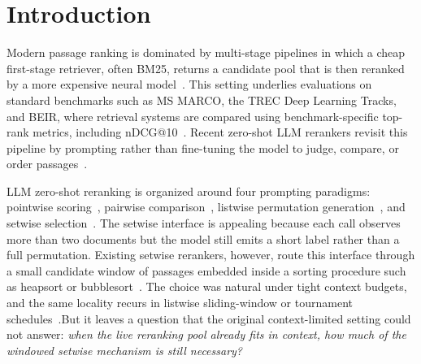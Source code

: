 \section{Introduction}
\label{sec:introduction}


Modern passage ranking is dominated by multi-stage pipelines in which a cheap first-stage retriever, often BM25, returns a candidate pool that is then reranked by a more expensive neural model~\citep{robertson2009probabilistic,nogueira2019passage,nogueira2020monot5,yates2021pretrained}. This setting underlies evaluations on standard benchmarks such as MS MARCO, the TREC Deep Learning Tracks, and BEIR, where retrieval systems are compared using benchmark-specific top-rank metrics, including nDCG@10~\citep{bajaj2016msmarco,craswell2020trecDL,craswell2021trecDL,thakur2021beir,jarvelin2002cumulated}. Recent zero-shot LLM rerankers revisit this pipeline by prompting rather than fine-tuning the model to judge, compare, or order passages~\citep{sachan2022upr,sun2023rankgpt,ma2023zeroshotlistwise,qin2024prp,zhuang2024setwise,pradeep2023rankvicuna,pradeep2023rankzephyr}.

LLM zero-shot reranking is organized around four prompting paradigms: pointwise scoring~\citep{nogueira2020monot5,sachan2022upr}, pairwise comparison~\citep{pradeep2021expandomonoduo,qin2024prp}, listwise permutation generation~\citep{ma2023zeroshotlistwise,sun2023rankgpt,pradeep2023rankvicuna,pradeep2023rankzephyr,yoon2024listt5}, and setwise selection~\citep{zhuang2024setwise}. The setwise interface is appealing because each call observes more than two documents but the model still emits a short label rather than a full permutation. Existing setwise rerankers, however, route this interface through a small candidate window of passages embedded inside a sorting procedure such as heapsort or bubblesort~\citep{zhuang2024setwise}. The choice was natural under tight context budgets, and the same locality recurs in listwise sliding-window or tournament schedules~\citep{sun2023rankgpt,ma2023zeroshotlistwise,yoon2024listt5}.But it leaves a question that the original context-limited setting could not answer: \emph{when the live reranking pool already fits in context, how much of the windowed setwise mechanism is still necessary?}

